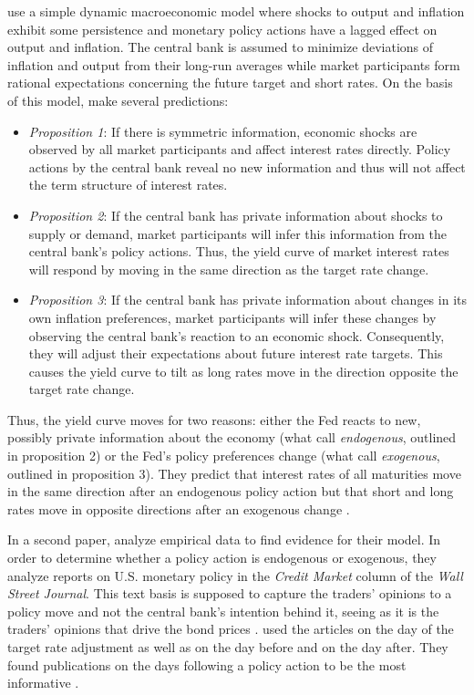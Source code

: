 \documentclass[11pt,a4paper,english,oneside]{book}
\numberwithin{equation}{chapter}
\begin{document}
\citet{Ellingsen.2001} use a simple dynamic macroeconomic model where shocks to output and inflation exhibit some persistence and monetary policy actions have a lagged effect on output and inflation. The central bank is assumed to minimize deviations of inflation and output from their long-run averages while market participants form rational expectations concerning the future target and short rates. On the basis of this model, \citet[~pp. 1599--1602]{Ellingsen.2001} make several predictions:
\begin{itemize}
	\item \textit{Proposition 1}: If there is symmetric information, economic shocks are observed by all market participants and affect  interest rates directly. Policy actions by the central bank reveal no new information and thus will not affect the term structure of interest rates.
	\item \textit{Proposition 2}: If the central bank has private information about shocks to supply or demand, market participants will infer this information from the central bank's policy actions. Thus, the yield curve of market interest rates will respond by moving in the same direction as the target rate change. 
	\item \textit{Proposition 3}: If the central bank has private information about changes in its own inflation preferences, market participants will infer these changes by observing the central bank's reaction to an economic shock. Consequently, they will adjust their expectations about future interest rate targets. This causes the yield curve to tilt as long rates move in the direction opposite the target rate change. 
\end{itemize}

Thus, the yield curve moves for two reasons: either the Fed reacts to new, possibly private information about the economy (what \citeauthor{Ellingsen.2001} call \textit{endogenous}, outlined in proposition 2) or the Fed's policy preferences change (what \citeauthor{Ellingsen.2001} call \textit{exogenous}, outlined in proposition 3). They predict that interest rates of all maturities move in the same direction after an endogenous policy action but that short and long rates move in opposite directions after an exogenous change \citeyearpar[~pp. 1594--1595]{Ellingsen.2001}. %

In a second paper, \cite{Ellingsen.2003} analyze empirical data to find evidence for their model. In order to determine whether a policy action is endogenous or exogenous, they analyze reports on U.S. monetary policy in the \textit{Credit Market} column of the \textit{Wall Street Journal}. This text basis is supposed to capture the traders' opinions to a policy move and not the central bank's intention behind it, seeing as it is the traders' opinions that drive the bond prices \cite[~p. 2]{Ellingsen.2003}. \citeauthor{Ellingsen.2003} used the articles on the day of the target rate adjustment as well as on the day before and on the day after. They found publications on the days following a policy action to be the most informative \citeyearpar[~p. 8]{Ellingsen.2003}.
\end{document}
